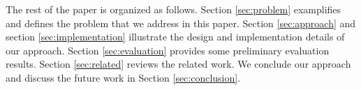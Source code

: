 The rest of the paper is organized as follows. 
Section \ref{sec:problem} examplifies and defines the problem that we address in this paper.
Section \ref{sec:approach} and section \ref{sec:implementation} illustrate the design and implementation details of our approach.
Section \ref{sec:evaluation} provides some preliminary evaluation results.
Section \ref{sec:related} reviews the related work.
We conclude our approach and discuss the future work in Section \ref{sec:conclusion}.

